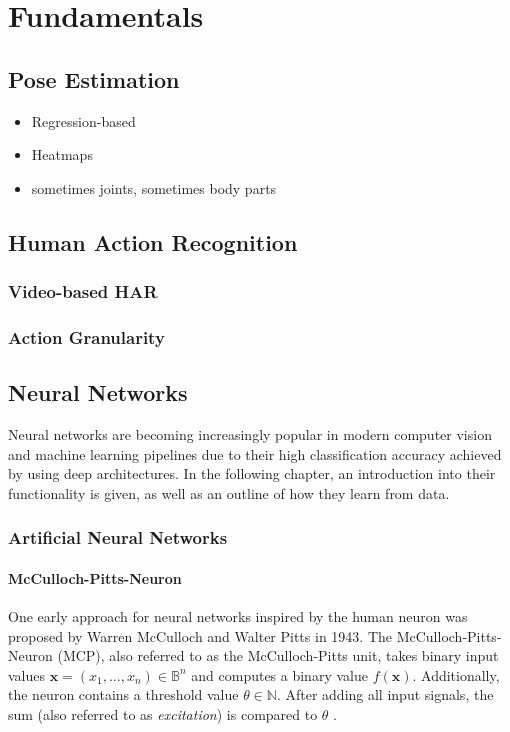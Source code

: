 \chapter{Fundamentals}

\section{Pose Estimation}
\begin{itemize}
    \item Regression-based
    \item Heatmaps
    \item sometimes joints, sometimes body parts
\end{itemize}

\section{Human Action Recognition}

\subsection{Video-based HAR}

\subsection{Action Granularity}

\section{Neural Networks}
Neural networks are becoming increasingly popular in modern computer vision and machine learning pipelines due to their high classification accuracy achieved by using deep architectures.
In the following chapter, an introduction into their functionality is given, as well as an outline of how they learn from data.

\subsection{Artificial Neural Networks}

\subsubsection{McCulloch-Pitts-Neuron}
One early approach for neural networks inspired by the human neuron was proposed by Warren McCulloch and Walter Pitts in 1943.
The McCulloch-Pitts-Neuron (MCP), also referred to as the McCulloch-Pitts unit, takes binary input values $\bm{x} = (x_1, \dots, x_n) \in \mathbb{B}^n$ and computes a binary value $f(\bm{x})$.
Additionally, the neuron contains a threshold value $\theta \in \mathbb{N}$.
After adding all input signals, the sum (also referred to as \textit{excitation}) is compared to $\theta$ .

